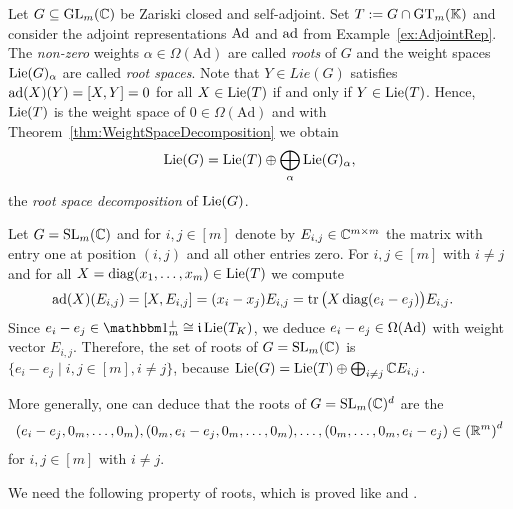 \begin{defn}\label{defn:Roots}
	Let $G \subseteq \operatorname{GL}_m(\mathbb C)$ be Zariski closed and self-adjoint. Set $T := G \cap \operatorname{GT}_m(\mathbb K)$ and consider the adjoint representations $\operatorname{Ad}$ and $\operatorname{ad}$ from Example~\ref{ex:AdjointRep}. The \emph{non-zero} weights $\alpha \in \Omega(\mathrm{Ad})$ are called \emph{roots} of $G$ and the weight spaces $\operatorname{Lie}(G)_{\alpha}$ are called \emph{root spaces}. Note that $Y \in Lie(G)$ satisfies $\operatorname{ad}(X)(Y) = [X, Y] = 0$ for all $X \in \operatorname{Lie}(T)$ if and only if $Y \in \operatorname{Lie}(T)$. Hence, $\operatorname{Lie}(T)$ is the weight space of $0 \in \Omega(\mathrm{Ad})$ and with Theorem~\ref{thm:WeightSpaceDecomposition} we obtain
		\[ \operatorname{Lie}(G) = \operatorname{Lie}(T) \oplus \bigoplus_\alpha \operatorname{Lie}(G)_\alpha ,\]
	the \emph{root space decomposition} of $\operatorname{Lie}(G)$.
	\hfill{}
\end{defn}

\begin{example} \label{exa:Roots}
	Let $G = \operatorname{SL}_m(\mathbb C)$ and for $i,j \in [m]$ denote by $E_{i,j} \in \mathbb C^{m \times m}$ the matrix with entry one at position $(i,j)$ and all other entries zero. For $i,j \in [m]$ with $i \neq j$ and for all $X = \operatorname{diag}(x_1, \ldots, x_m) \in \operatorname{Lie}(T)$ we compute
	\begin{align*}
		\mathrm{ad}(X)(E_{i,j}) &= [X,E_{i,j}] = (x_i - x_j) E_{i,j} = \operatorname{tr} \big( X \operatorname{diag}(e_i - e_j) \big) E_{i,j} .
	\end{align*}
	Since $e_i - e_j \in \onePerp \cong \imag \Lie(T_K)$, we deduce $e_i - e_j \in \Omega(\operatorname{Ad})$ with weight vector $E_{i,j}$. Therefore, the set of roots of $G = \operatorname{SL}_m(\mathbb C)$ is $\lbrace e_i - e_j \mid i,j \in [m], i\neq j \rbrace$, because $\operatorname{Lie}(G) = \operatorname{Lie}(T) \oplus \bigoplus_{i \neq j} \mathbb C E_{i,j}$.
	
	More generally, one can deduce that the roots of $G = \operatorname{SL}_m(\mathbb C)^d$ are the 
	\begin{align*}
		(e_i - e_j, 0_m, \ldots, 0_m), (0_m, e_i - e_j, 0_m, \ldots, 0_m), \ldots, (0_m, \ldots, 0_m, e_i - e_j) \in \left( \mathbb R^m \right)^d
	\end{align*}
	for $i,j \in [m]$ with $i \neq j$.
	\hfill\exSymbol
\end{example}

We need the following property of roots, which is proved like \cite[Lemma~6.5]{HallBook} and \cite[Proposition~5.4(c)]{KnappBook}.


